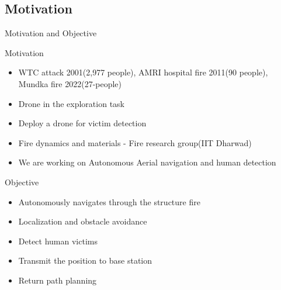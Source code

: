 \documentclass[10pt]{beamer}
\begin{document}
\subsection*{Motivation}
\begin{frame}{Motivation and Objective}
    \begin{block}{Motivation}
        \begin{itemize}
            \item WTC attack 2001(2,977 people), AMRI hospital fire 2011(90 people), Mundka fire 2022(27-people)
            \item Drone in the exploration task
            \item Deploy a drone for victim detection
            \item Fire dynamics and materials - Fire research group(IIT Dharwad)
            \item We are working on Autonomous Aerial navigation and human detection
        \end{itemize}
    \end{block}

    \pause \begin{block}{Objective}
        \begin{itemize}
            \item Autonomously navigates through the structure fire
            \item Localization and obstacle avoidance
            \item Detect human victims
            \item Transmit the position to base station
            \item Return path planning
        \end{itemize}
    \end{block}
\end{frame}
\end{document}
